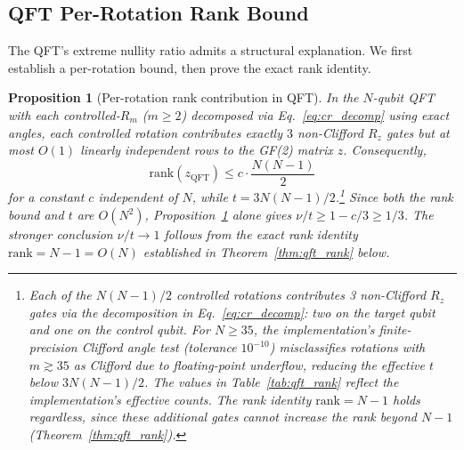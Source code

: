 \documentclass[a4paper,twocolumn,11pt]{quantumarticle}
\newtheorem{proposition}[theorem]{Proposition}
\begin{document}
\subsection{QFT Per-Rotation Rank Bound}

The QFT's extreme nullity ratio admits a structural explanation.
We first establish a per-rotation bound, then prove the exact rank identity.

\begin{proposition}[Per-rotation rank contribution in QFT]
\label{prop:qft_rotation}
In the $N$-qubit QFT with each controlled-$R_m$ ($m \ge 2$) decomposed via Eq.~\eqref{eq:cr_decomp} using exact angles, each controlled rotation contributes exactly $3$ non-Clifford $R_z$ gates but at most $O(1)$ linearly independent rows to the GF(2) matrix $z$.
Consequently,
\begin{equation}
\label{eq:qft_per_rotation}
\mathrm{rank}(z_{\mathrm{QFT}}) \le c \cdot \frac{N(N-1)}{2}
\end{equation}
for a constant $c$ independent of $N$, while $t = 3N(N-1)/2$.\footnote{Each of the $N(N-1)/2$ controlled rotations contributes 3 non-Clifford $R_z$ gates via the decomposition in Eq.~\eqref{eq:cr_decomp}: two on the target qubit and one on the control qubit. For $N \ge 35$, the implementation's finite-precision Clifford angle test (tolerance $10^{-10}$) misclassifies rotations with $m \gtrsim 35$ as Clifford due to floating-point underflow, reducing the effective $t$ below $3N(N-1)/2$. The values in Table~\ref{tab:qft_rank} reflect the implementation's effective counts. The rank identity $\mathrm{rank} = N - 1$ holds regardless, since these additional gates cannot increase the rank beyond $N - 1$ (Theorem~\ref{thm:qft_rank}).}
Since both the rank bound and $t$ are $O(N^2)$, Proposition~\ref{prop:qft_rotation} alone gives $\nu/t \ge 1 - c/3 \ge 1/3$.
The stronger conclusion $\nu/t \to 1$ follows from the exact rank identity $\mathrm{rank} = N - 1 = O(N)$ established in Theorem~\ref{thm:qft_rank} below.
\end{proposition}
\end{document}
